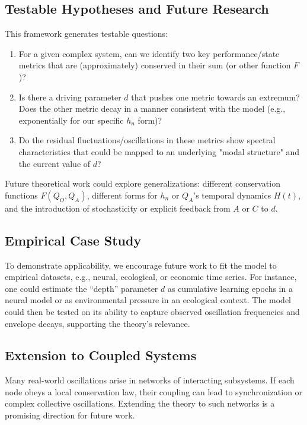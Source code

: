 \documentclass[11pt,a4paper]{article}
\begin{document}
\subsection{Testable Hypotheses and Future Research}

This framework generates testable questions:
\begin{enumerate}
    \item For a given complex system, can we identify two key performance/state metrics that are (approximately) conserved in their sum (or other function $F$)?
    \item Is there a driving parameter $d$ that pushes one metric towards an extremum? Does the other metric decay in a manner consistent with the model (e.g., exponentially for our specific $h_n$ form)?
    \item Do the residual fluctuations/oscillations in these metrics show spectral characteristics that could be mapped to an underlying "modal structure" and the current value of $d$?
\end{enumerate}

Future theoretical work could explore generalizations: different conservation functions $F(Q_O, Q_A)$, different forms for $h_n$ or $Q_A$'s temporal dynamics $H(t)$, and the introduction of stochasticity or explicit feedback from $A$ or $C$ to $d$.

\subsection{Empirical Case Study}
To demonstrate applicability, we encourage future work to fit the model to empirical datasets, e.g., neural, ecological, or economic time series. For instance, one could estimate the ``depth'' parameter $ d $ as cumulative learning epochs in a neural model or as environmental pressure in an ecological context. The model could then be tested on its ability to capture observed oscillation frequencies and envelope decays, supporting the theory’s relevance.

\subsection{Extension to Coupled Systems}
Many real-world oscillations arise in networks of interacting subsystems.
If each node obeys a local conservation law, their coupling can lead to synchronization or complex collective oscillations.
Extending the theory to such networks is a promising direction for future work.
\end{document}
